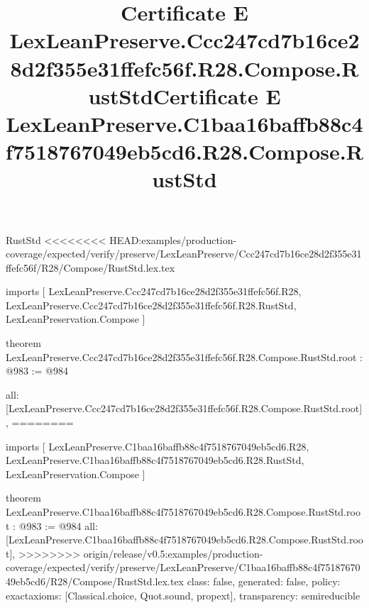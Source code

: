 \begin{lexlean}{RustStd}
<<<<<<<< HEAD:examples/production-coverage/expected/verify/preserve/LexLeanPreserve/Ccc247cd7b16ce28d2f355e31ffefc56f/R28/Compose/RustStd.lex.tex
\title{Certificate E LexLeanPreserve.Ccc247cd7b16ce28d2f355e31ffefc56f.R28.Compose.RustStd}
\begin{coremodule}
imports [
  LexLeanPreserve.Ccc247cd7b16ce28d2f355e31ffefc56f.R28,
  LexLeanPreserve.Ccc247cd7b16ce28d2f355e31ffefc56f.R28.RustStd,
  LexLeanPreservation.Compose
]

theorem LexLeanPreserve.Ccc247cd7b16ce28d2f355e31ffefc56f.R28.Compose.RustStd.root : @983 := @984 {
  all: [LexLeanPreserve.Ccc247cd7b16ce28d2f355e31ffefc56f.R28.Compose.RustStd.root],
========
\title{Certificate E LexLeanPreserve.C1baa16baffb88c4f7518767049eb5cd6.R28.Compose.RustStd}
\begin{coremodule}
imports [
  LexLeanPreserve.C1baa16baffb88c4f7518767049eb5cd6.R28,
  LexLeanPreserve.C1baa16baffb88c4f7518767049eb5cd6.R28.RustStd,
  LexLeanPreservation.Compose
]

theorem LexLeanPreserve.C1baa16baffb88c4f7518767049eb5cd6.R28.Compose.RustStd.root : @983 := @984 {
  all: [LexLeanPreserve.C1baa16baffb88c4f7518767049eb5cd6.R28.Compose.RustStd.root],
>>>>>>>> origin/release/v0.5:examples/production-coverage/expected/verify/preserve/LexLeanPreserve/C1baa16baffb88c4f7518767049eb5cd6/R28/Compose/RustStd.lex.tex
  class: false,
  generated: false,
  policy: exact{axioms: [Classical.choice, Quot.sound, propext]},
  transparency: semireducible
}


\end{coremodule}}
\end{coremodule}
\end{lexlean}
